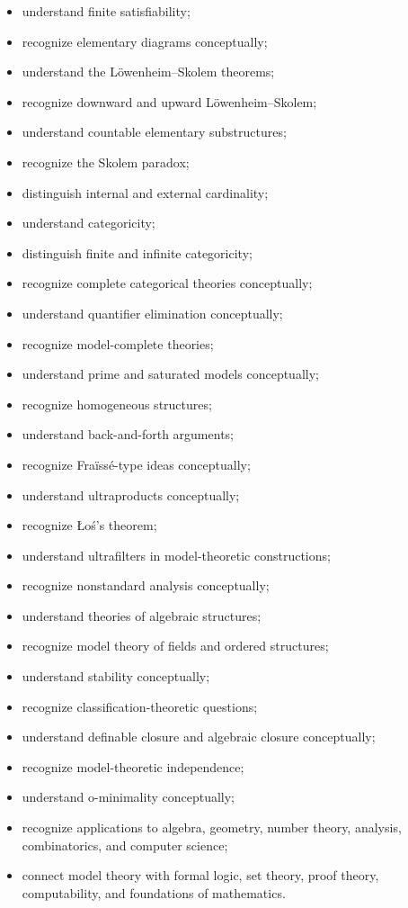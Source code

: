 {\begin{itemize}
    \item understand finite satisfiability;
    \item recognize elementary diagrams conceptually;
    \item understand the Löwenheim--Skolem theorems;
    \item recognize downward and upward Löwenheim--Skolem;
    \item understand countable elementary substructures;
    \item recognize the Skolem paradox;
    \item distinguish internal and external cardinality;
    \item understand categoricity;
    \item distinguish finite and infinite categoricity;
    \item recognize complete categorical theories conceptually;
    \item understand quantifier elimination conceptually;
    \item recognize model-complete theories;
    \item understand prime and saturated models conceptually;
    \item recognize homogeneous structures;
    \item understand back-and-forth arguments;
    \item recognize Fraïssé-type ideas conceptually;
    \item understand ultraproducts conceptually;
    \item recognize Łoś's theorem;
    \item understand ultrafilters in model-theoretic constructions;
    \item recognize nonstandard analysis conceptually;
    \item understand theories of algebraic structures;
    \item recognize model theory of fields and ordered structures;
    \item understand stability conceptually;
    \item recognize classification-theoretic questions;
    \item understand definable closure and algebraic closure conceptually;
    \item recognize model-theoretic independence;
    \item understand o-minimality conceptually;
    \item recognize applications to algebra, geometry, number theory,
          analysis, combinatorics, and computer science;
    \item connect model theory with formal logic, set theory, proof theory,
          computability, and foundations of mathematics.
\end{itemize}
}

